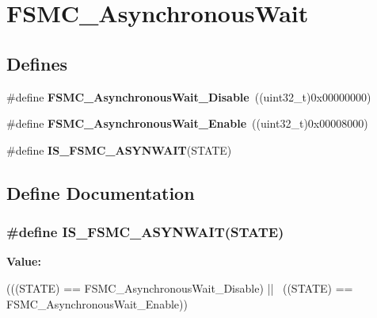 \hypertarget{group__FSMC__AsynchronousWait}{
\section{FSMC\_\-AsynchronousWait}
\label{group__FSMC__AsynchronousWait}
}
\subsection*{Defines}
\begin{DoxyCompactItemize}
\item 
\hypertarget{group__FSMC__AsynchronousWait_ga36c0dad6fe6c0e01632d3312c8f4c4cb}{
\#define {\bfseries FSMC\_\-AsynchronousWait\_\-Disable}~((uint32\_\-t)0x00000000)}
\label{group__FSMC__AsynchronousWait_ga36c0dad6fe6c0e01632d3312c8f4c4cb}

\item 
\hypertarget{group__FSMC__AsynchronousWait_gaff524bfa697106ede7d4b557a5ad7d8c}{
\#define {\bfseries FSMC\_\-AsynchronousWait\_\-Enable}~((uint32\_\-t)0x00008000)}
\label{group__FSMC__AsynchronousWait_gaff524bfa697106ede7d4b557a5ad7d8c}

\item 
\#define {\bfseries IS\_\-FSMC\_\-ASYNWAIT}(STATE)
\end{DoxyCompactItemize}


\subsection{Define Documentation}
\hypertarget{group__FSMC__AsynchronousWait_ga52d579de825316ee058baf11bfb749d6}{
\subsubsection[{IS\_\-FSMC\_\-ASYNWAIT}]{\setlength{\rightskip}{0pt plus 5cm}\#define IS\_\-FSMC\_\-ASYNWAIT(STATE)}}
\label{group__FSMC__AsynchronousWait_ga52d579de825316ee058baf11bfb749d6}
{\bfseries Value:}
\begin{DoxyCode}
(((STATE) == FSMC_AsynchronousWait_Disable) || \
                                 ((STATE) == FSMC_AsynchronousWait_Enable))
\end{DoxyCode}
